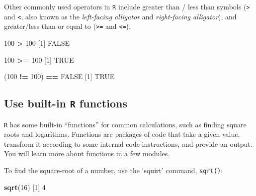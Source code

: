 \documentclass[]{book}
\newenvironment{Shaded}{\begin{snugshade}}{\end{snugshade}}
\newcommand{\DecValTok}[1]{\textcolor[rgb]{0.00,0.00,0.81}{#1}}
\newcommand{\KeywordTok}[1]{\textcolor[rgb]{0.13,0.29,0.53}{\textbf{#1}}}
\newcommand{\NormalTok}[1]{#1}
\newcommand{\OperatorTok}[1]{\textcolor[rgb]{0.81,0.36,0.00}{\textbf{#1}}}
\newcommand{\OtherTok}[1]{\textcolor[rgb]{0.56,0.35,0.01}{#1}}
\newcommand{\StringTok}[1]{\textcolor[rgb]{0.31,0.60,0.02}{#1}}
\begin{document}
Other commonly used operators in \texttt{R} include greater than / less than symbols (\texttt{\textgreater{}} and \texttt{\textless{}}, also known as the \emph{left-facing alligator} and \emph{right-facing alligator}), and greater/less than or equal to (\texttt{\textgreater{}=} and \texttt{\textless{}=}).

\begin{Shaded}
\begin{Highlighting}[]
\DecValTok{100} \OperatorTok{>}\StringTok{ }\DecValTok{100}
\NormalTok{[}\DecValTok{1}\NormalTok{] }\OtherTok{FALSE}
\end{Highlighting}
\end{Shaded}

\begin{Shaded}
\begin{Highlighting}[]
\DecValTok{100} \OperatorTok{>=}\StringTok{ }\DecValTok{100}
\NormalTok{[}\DecValTok{1}\NormalTok{] }\OtherTok{TRUE}
\end{Highlighting}
\end{Shaded}

\begin{Shaded}
\begin{Highlighting}[]
\NormalTok{(}\DecValTok{100} \OperatorTok{!=}\StringTok{ }\DecValTok{100}\NormalTok{) }\OperatorTok{==}\StringTok{ }\OtherTok{FALSE}
\NormalTok{[}\DecValTok{1}\NormalTok{] }\OtherTok{TRUE}
\end{Highlighting}
\end{Shaded}

\hypertarget{use-built-in-r-functions}{%
\subsection*{\texorpdfstring{Use built-in \texttt{R} functions}{Use built-in R functions}}\label{use-built-in-r-functions}}

\texttt{R} has some built-in ``functions'' for common calculations, such as finding square roots and logarithms. Functions are packages of code that take a given value, transform it according to some internal code instructions, and provide an output. You will learn more about functions in a few modules.

To find the square-root of a number, use the `squirt' command, \texttt{sqrt()}:

\begin{Shaded}
\begin{Highlighting}[]
\KeywordTok{sqrt}\NormalTok{(}\DecValTok{16}\NormalTok{)}
\NormalTok{[}\DecValTok{1}\NormalTok{] }\DecValTok{4}
\end{Highlighting}
\end{Shaded}
\end{document}
